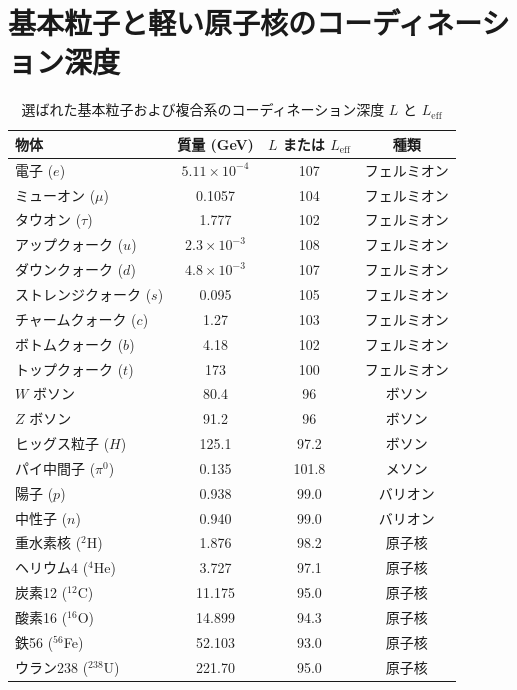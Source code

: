 \documentclass[12pt,a4paper]{article}
\begin{document}
	\section{基本粒子と軽い原子核のコーディネーション深度}
	\begin{table}[H]
		\centering
		\caption{選ばれた基本粒子および複合系のコーディネーション深度 $L$ と $L_{\mathrm{eff}}$}
		\label{tab:depths_particles}
		\small
		\begin{tabular}{l c c c}
			\toprule
			\textbf{物体} & \textbf{質量 (GeV)} & \textbf{$L$ または $L_{\mathrm{eff}}$} & \textbf{種類} \\
			\midrule
			電子 ($e$) & $5.11\times10^{-4}$ & 107 & フェルミオン \\
			ミューオン ($\mu$) & 0.1057 & 104 & フェルミオン \\
			タウオン ($\tau$) & 1.777 & 102 & フェルミオン \\
			アップクォーク ($u$) & $2.3\times10^{-3}$ & 108 & フェルミオン \\
			ダウンクォーク ($d$) & $4.8\times10^{-3}$ & 107 & フェルミオン \\
			ストレンジクォーク ($s$) & 0.095 & 105 & フェルミオン \\
			チャームクォーク ($c$) & 1.27 & 103 & フェルミオン \\
			ボトムクォーク ($b$) & 4.18 & 102 & フェルミオン \\
			トップクォーク ($t$) & 173 & 100 & フェルミオン \\
			$W$ ボソン & 80.4 & 96 & ボソン \\
			$Z$ ボソン & 91.2 & 96 & ボソン \\
			ヒッグス粒子 ($H$) & 125.1 & 97.2 & ボソン \\
			パイ中間子 ($\pi^0$) & 0.135 & 101.8 & メソン \\
			陽子 ($p$) & 0.938 & 99.0 & バリオン \\
			中性子 ($n$) & 0.940 & 99.0 & バリオン \\
			重水素核 ($^2$H) & 1.876 & 98.2 & 原子核 \\
			ヘリウム4 ($^4$He) & 3.727 & 97.1 & 原子核 \\
			炭素12 ($^{12}$C) & 11.175 & 95.0 & 原子核 \\
			酸素16 ($^{16}$O) & 14.899 & 94.3 & 原子核 \\
			鉄56 ($^{56}$Fe) & 52.103 & 93.0 & 原子核 \\
			ウラン238 ($^{238}$U) & 221.70 & 95.0 & 原子核 \\
			\bottomrule
		\end{tabular}
	\end{table}
	
\end{document}
